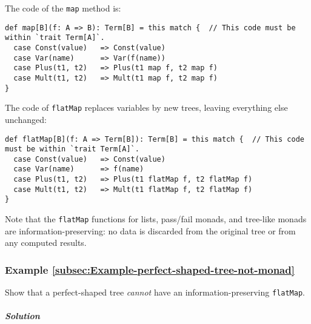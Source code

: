 The code of the \lstinline!map! method is:
\begin{lstlisting}
def map[B](f: A => B): Term[B] = this match {  // This code must be within `trait Term[A]`.
  case Const(value)   => Const(value)
  case Var(name)      => Var(f(name))
  case Plus(t1, t2)   => Plus(t1 map f, t2 map f)
  case Mult(t1, t2)   => Mult(t1 map f, t2 map f)
}
\end{lstlisting}
The code of \lstinline!flatMap! replaces variables by new trees,
leaving everything else unchanged:
\begin{lstlisting}
def flatMap[B](f: A => Term[B]): Term[B] = this match {  // This code must be within `trait Term[A]`.
  case Const(value)   => Const(value)
  case Var(name)      => f(name)
  case Plus(t1, t2)   => Plus(t1 flatMap f, t2 flatMap f)
  case Mult(t1, t2)   => Mult(t1 flatMap f, t2 flatMap f)
}
\end{lstlisting}

Note that the \lstinline!flatMap! functions for lists, pass/fail
monads, and tree-like monads are information-preserving: no data is
discarded from the original tree or from any computed results.

\subsubsection{Example \label{subsec:Example-perfect-shaped-tree-not-monad}\ref{subsec:Example-perfect-shaped-tree-not-monad}}

Show that a perfect-shaped tree \emph{cannot} have an information-preserving
\lstinline!flatMap!.

\subparagraph{Solution}

